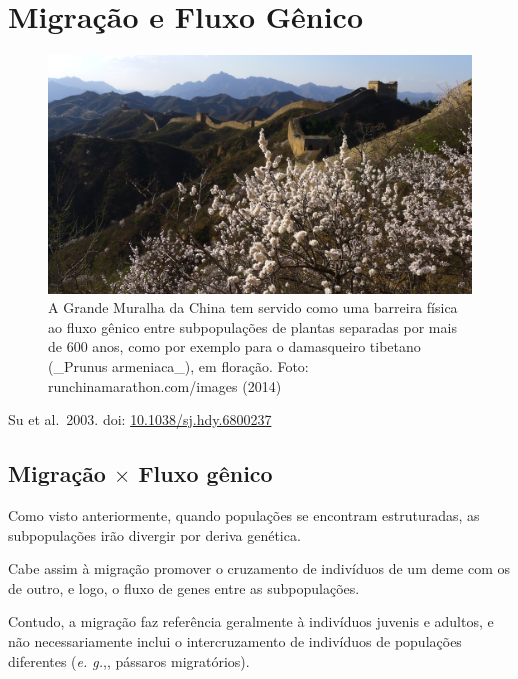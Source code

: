 \documentclass[
]{book}
\begin{document}
\hypertarget{migrauxe7uxe3o-e-fluxo-guxeanico}{%
\chapter{Migração e Fluxo Gênico}\label{migrauxe7uxe3o-e-fluxo-guxeanico}}

\begin{figure}

{\centering \includegraphics[width=800px]{figs/apricot_blossom_great_wall} 

}

\caption{A Grande Muralha da China tem servido como uma barreira física ao fluxo gênico entre subpopulações de plantas separadas por mais de 600 anos, como por exemplo para o damasqueiro tibetano (_Prunus armeniaca_), em floração. Foto: runchinamarathon.com/images (2014)}\label{fig:apricot}
\end{figure}

Su et al.~2003. doi: \href{https://doi.org/10.1038/sj.hdy.6800237}{10.1038/sj.hdy.6800237}

\hypertarget{migrauxe7uxe3o-times-fluxo-guxeanico}{%
\section{\texorpdfstring{Migração \(\times\) Fluxo gênico}{Migração \textbackslash times Fluxo gênico}}\label{migrauxe7uxe3o-times-fluxo-guxeanico}}

Como visto anteriormente, quando populações se encontram estruturadas, as subpopulações irão divergir por deriva genética.

Cabe assim à migração promover o cruzamento de indivíduos de um deme com os de outro, e logo, o fluxo de genes entre as subpopulações.

Contudo, a migração faz referência geralmente à indivíduos juvenis e adultos, e não necessariamente inclui o intercruzamento de indivíduos de populações diferentes (\emph{e. g.},, pássaros migratórios).
\end{document}
